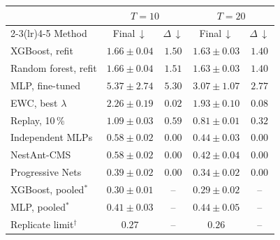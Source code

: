 \begin{tabular}{@{}lcccc@{}}
\toprule
 & \multicolumn{2}{c}{$T=10$} & \multicolumn{2}{c}{$T=20$} \\
\cmidrule(lr){2-3}\cmidrule(lr){4-5}
Method & Final\,$\downarrow$ & $\Delta$\,$\downarrow$ & Final\,$\downarrow$ & $\Delta$\,$\downarrow$ \\
\midrule
XGBoost, refit & $1.66\pm0.04$ & $1.50$ & $1.63\pm0.03$ & $1.40$ \\
Random forest, refit & $1.66\pm0.04$ & $1.51$ & $1.63\pm0.03$ & $1.40$ \\
MLP, fine-tuned & $5.37\pm2.74$ & $5.30$ & $3.07\pm1.07$ & $2.77$ \\
EWC, best $\lambda$ & $2.26\pm0.19$ & $0.02$ & $1.93\pm0.10$ & $0.08$ \\
Replay, 10\,\% & $1.09\pm0.03$ & $0.59$ & $0.81\pm0.01$ & $0.32$ \\
Independent MLPs & $0.58\pm0.02$ & $0.00$ & $0.44\pm0.03$ & $0.00$ \\
NestAnt-CMS & $0.58\pm0.02$ & $0.00$ & $0.42\pm0.04$ & $0.00$ \\
Progressive Nets & $0.39\pm0.02$ & $0.00$ & $0.34\pm0.02$ & $0.00$ \\
\midrule
XGBoost, pooled$^\ast$ & $0.30\pm0.01$ & -- & $0.29\pm0.02$ & -- \\
MLP, pooled$^\ast$ & $0.41\pm0.03$ & -- & $0.44\pm0.05$ & -- \\
Replicate limit$^\dagger$ & $0.27$ & -- & $0.26$ & -- \\
\bottomrule
\end{tabular}
